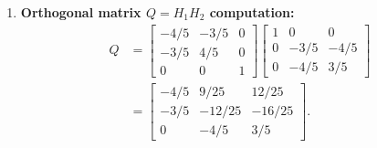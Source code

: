 \begin{example}
\begin{enumerate}
\begin{itemize}
\begin{equation}
        \end{equation}
        \item The third column (rows 2--3) is given by:
        \begin{align}
            \hat{H}_2 \begin{bmatrix} 4 \\ -3 \end{bmatrix} &= \begin{bmatrix} (-3/5)(4) + (-4/5)(-3) \\ (-4/5)(4) + (3/5)(-3) \end{bmatrix} \nonumber\\
            &= \begin{bmatrix} -12/5 + 12/5 \\ -16/5 - 9/5 \end{bmatrix} = \begin{bmatrix} 0 \\ -5 \end{bmatrix}.
        \end{align}
    \end{itemize}
    We obtain the upper triangular matrix $R$:
    \begin{equation}
        R = \begin{bmatrix} 
        -5 & 4 & 2 \\ 
        0 & -5 & 0 \\ 
        0 & 0 & -5 
        \end{bmatrix}.
    \end{equation}
    \item \textbf{Orthogonal matrix $Q = H_1 H_2$ computation:}
    \begin{align}
        Q &= \begin{bmatrix} 
        -4/5 & -3/5 & 0 \\ 
        -3/5 & 4/5 & 0 \\ 
        0 & 0 & 1 
        \end{bmatrix}
        \begin{bmatrix} 
        1 & 0 & 0 \\ 
        0 & -3/5 & -4/5 \\ 
        0 & -4/5 & 3/5 
        \end{bmatrix} \nonumber\\
        &= \begin{bmatrix} 
        -4/5 & 9/25 & 12/25 \\ 
        -3/5 & -12/25 & -16/25 \\ 
        0 & -4/5 & 3/5 
        \end{bmatrix}.
    \end{align}
\end{enumerate}


\end{example}
